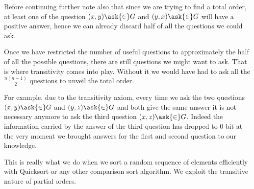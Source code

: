 Before continuing further note also that since we are trying to find a total
order, at least one of the question $(x, y) \ask{\in} G$ and $(y, x)
\ask{\in} G$ will have a positive answer, hence we can already discard
half of all the questions we could ask.

Once we have restricted the number of useful questions to approximately the
half of all the possible questions, there are still  questions we
might want to ask. That is where transitivity comes into play. Without it we
would have had to ask all the $\frac{n (n-1)}{2}$ questions to unveil the total
order.

For example, due to the transitivity axiom, every time we ask the two questions
$(x, y) \ask{\in} G$ and $(y, z) \ask{\in} G$ and both give the
same answer it is not necessary anymore to ask the third question $(x, z)
\ask{\in} G$. Indeed the information carried by the answer of the
third question has dropped to 0 bit at the very moment we brought answers for
the first and second question to our knowledge.

This is really what we do when we sort a random sequence of elements
efficiently with Quicksort or any other  comparison sort
algorithm. We exploit the transitive nature of partial orders.
